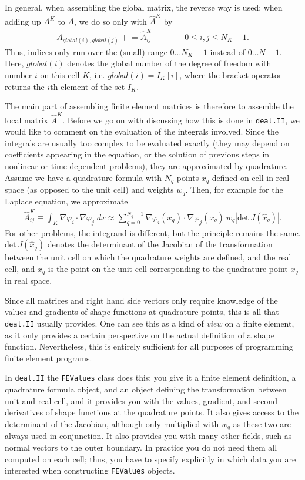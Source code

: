 \documentclass{article}
\begin{document}
In general, when assembling the global matrix, the reverse way is used: when
adding up $A^K$ to $A$, we do so only with $\hat A^K$ by
\begin{gather*}
  A_{global(i),global(j)} 
  +\!\!=
  \hat A^K_{ij}
  \qquad
  \qquad
  0\le i,j\le N_K-1.
\end{gather*}
Thus, indices only run over the (small) range $0\ldots N_K-1$ instead of
$0\ldots N-1$. Here, $global(i)$ denotes the global number of the degree of
freedom with number $i$ on this cell $K$, i.e. $global(i)=I_K[i]$, where the
bracket operator returns the $i$th element of the set $I_K$.

The main part of assembling finite element matrices is therefore to assemble
the local matrix $\hat A^K$. Before we go on with discussing how this is done
in \texttt{deal.II}, we would like to comment on the evaluation of the
integrals involved. Since the integrals are usually too complex to be
evaluated exactly (they may depend on coefficients appearing in the equation,
or the solution of previous steps in nonlinear or time-dependent problems),
they are approximated by quadrature. Assume we have a quadrature formula with
$N_q$ points $x_q$ defined on cell in real space (as opposed to the unit cell)
and weights $w_q$. Then, for example for the Laplace equation, we approximate
\begin{gather}
  \hat A^K_{ij}
  \equiv
  \int_K \nabla\varphi_i \cdot \nabla \varphi_j \; dx
  \approx
  \sum_{q=0}^{N_q-1} 
  \nabla\varphi_i(x_q) \cdot \nabla \varphi_j(x_q)
  \ w_q |\text{det} \ J(\hat x_q)|.
\end{gather}
For other problems, the integrand is different, but the principle remains the
same. $\text{det}\ J(\hat x_q)$ denotes the determinant of the Jacobian of the
transformation between the unit cell on which the quadrature weights are
defined, and the real cell, and $\hat x_q$ is the point on the unit cell
corresponding to the quadrature point $x_q$ in real space.

Since all matrices and right hand side vectors only require knowledge of the
values and gradients of shape functions at quadrature points, this is all that
\texttt{deal.II} usually provides. One can see this as a kind of \textit{view}
on a finite element, as it only provides a certain perspective on the actual
definition of a shape function. Nevertheless, this is entirely sufficient for
all purposes of programming finite element programs. 

In \texttt{deal.II} the \texttt{FEValues} class does this: you give it a
finite element definition, a quadrature formula object, and an object defining
the transformation between unit and real cell, and it provides you with the
values, gradient, and second derivatives of shape functions at the quadrature
points. It also gives access to the determinant of the Jacobian, although only
multiplied with $w_q$ as these two are always used in conjunction. It also
provides you with many other fields, such as normal vectors to the outer
boundary. In practice you do not need them all computed on each cell; thus,
you have to specify explicitly in which data you are interested when
constructing \texttt{FEValues} objects.
\end{document}
